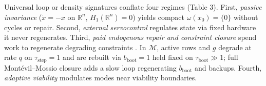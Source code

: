 \documentclass[12pt,letterpaper]{article}
\begin{document}
Universal loop or density signatures \citep{friston2013} conflate four
regimes (Table 3). First, \emph{passive invariance} (\(\dot{x} = -x\) on
\(\mathbb{R}^n\), \(H_1(\mathbb{R}^n) = 0\)) yields compact
\(\omega(x_0) = \{0\}\) without cycles or repair. Second, \emph{external
servocontrol} \citep{rosenblueth1943, conantAshby1970} regulates state
via fixed hardware it never regenerates. Third, \emph{paid endogenous
repair and constraint closure}
\citetext{\citealp[§§64--65]{kant1790}; \citealp{varela1974}; \citealp{maturanaVarela1980}; \citealp{weberVarela2002}; \citealp{rosen1991}; \citealp{kauffman1993}; \citealp{deacon2011}; \citealp{mossio2009}; \citealp{montevilMossio2015}}
spend work to regenerate degrading constraints
\citep{jonas1966, thompson2007}. In \(\mathcal{M}\), active rows and
\(g\) degrade at rate \(q\) on \(\tau_{\mathrm{step}}=1\) and are
rebuilt via \(b_{\mathrm{boot}}=1\) held fixed on
\(\tau_{\mathrm{boot}} \gg 1\); full Montévil--Mossio closure adds a
slow loop regenerating \(b_{\mathrm{boot}}\) and backups. Fourth,
\emph{adaptive viability}
\citep{aubinCellina1984, diPaolo2005, barandiaran2009, bich2024}
modulates modes near viability boundaries.

\end{document}
